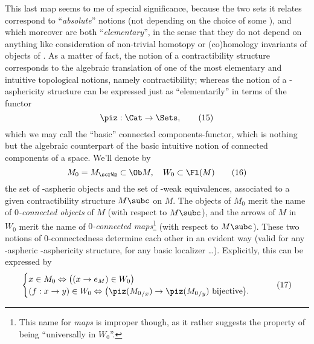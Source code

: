 This last map seems to me of special significance, because the two
sets it relates correspond to ``\emph{absolute}'' notions (not
depending on the choice of some \scrW), and which moreover are both
``\emph{elementary}'', in the sense that they do not depend on
anything like consideration of non-trivial homotopy or (co)homology
invariants of objects of \Cat. As a matter of fact, the notion of a
contractibility structure corresponds to the algebraic translation of
one of the most elementary and intuitive topological notions, namely
contractibility; whereas the notion of a \scrWz-asphericity structure
can be expressed just as ``elementarily'' in terms of the functor
\begin{equation}
  \label{eq:81.15}
  \piz:\Cat\to\Sets,\tag{15}
\end{equation}
which we may call the ``basic'' connected components-functor, which is
nothing but the algebraic counterpart of the basic intuitive notion of
connected components of a space. We'll denote by
\begin{equation}
  \label{eq:81.16}
  M_0=M_\scrWz\subset\Ob M,\quad W_0\subset\Fl(M)\tag{16}
\end{equation}
the set of \scrWz-aspheric objects and the set of \scrWz-weak
equivalences, associated to a given contractibility structure $M\subc$
on $M$. The objects of $M_0$ merit the name of
\emph{$0$-connected objects} of $M$ (with respect to $M\subc$), and
the arrows of $M$ in $W_0$ merit the name of \emph{$0$-connected
  maps}\footnote{ This name for \emph{maps} is
  improper though, as it rather suggests the property of being
  ``universally in $W_0$''.} (with respect to $M\subc$). These two
notions of $0$-connectedness determine each other in an evident way
(valid for any \scrW-aspheric \scrW-asphericity structure, for any
basic localizer \scrW\ldots). Explicitly, this can be expressed by
\begin{equation}
  \label{eq:81.17}
  \begin{cases}
    x\in M_0 \Leftrightarrow \bigl( (x\to e_M)\in W_0 \bigr) \\
    (f:x\to y)\in W_0 \Leftrightarrow
    \bigl(\text{$\piz({M_0}_{/x})\to\piz({M_0}_{/y})$
      bijective}\bigr).
  \end{cases}
  \tag{17}
\end{equation}

